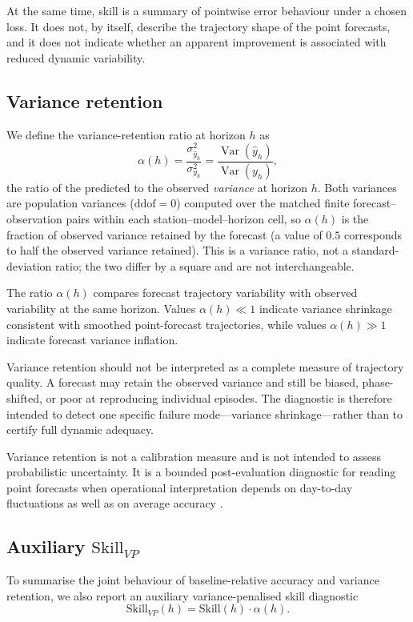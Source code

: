 \documentclass[3p,times,single-column]{elsarticle}
\begin{document}
At the same time, skill is a summary of pointwise error behaviour under a chosen loss. It does not, by itself, describe the trajectory shape of the point forecasts, and it does not indicate whether an apparent improvement is associated with reduced dynamic variability.

\subsection{Variance retention}
We define the variance-retention ratio at horizon \(h\) as
\begin{equation}
\alpha(h) = \frac{\sigma^2_{\hat{y}_h}}{\sigma^2_{y_h}}
          = \frac{\operatorname{Var}(\hat{y}_h)}{\operatorname{Var}(y_h)},
\end{equation}
the ratio of the predicted to the observed \emph{variance} at horizon \(h\).
Both variances are population variances (\(\mathrm{ddof}=0\)) computed over the
matched finite forecast--observation pairs within each station--model--horizon
cell, so \(\alpha(h)\) is the fraction of observed variance retained by the
forecast (a value of \(0.5\) corresponds to half the observed variance
retained). This is a variance ratio, not a standard-deviation ratio; the two
differ by a square and are not interchangeable.

The ratio \(\alpha(h)\) compares forecast trajectory variability with observed variability at the same horizon. Values \(\alpha(h)\ll 1\) indicate variance shrinkage consistent with smoothed point-forecast trajectories, while values \(\alpha(h)\gg 1\) indicate forecast variance inflation.

Variance retention should not be interpreted as a complete measure of trajectory quality. A forecast may retain the observed variance and still be biased, phase-shifted, or poor at reproducing individual episodes. The diagnostic is therefore intended to detect one specific failure mode—variance shrinkage—rather than to certify full dynamic adequacy.

Variance retention is not a calibration measure and is not intended to assess probabilistic uncertainty. It is a bounded post-evaluation diagnostic for reading point forecasts when operational interpretation depends on day-to-day fluctuations as well as on average accuracy \cite{jolliffe2012}.

\subsection{Auxiliary \texorpdfstring{\(\mathrm{Skill}_{VP}\)}{Skill\_VP}}
To summarise the joint behaviour of baseline-relative accuracy and variance retention, we also report an auxiliary variance-penalised skill diagnostic
\begin{equation}
\mathrm{Skill}_{VP}(h) = \mathrm{Skill}(h)\cdot\alpha(h).
\end{equation}
\end{document}
